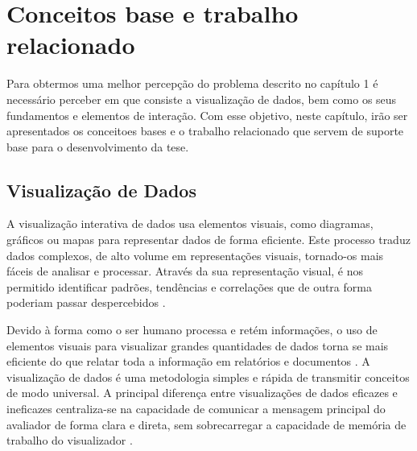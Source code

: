 
%

\chapter{Conceitos base e trabalho relacionado}
\label{cha:conceitos_base}

Para obtermos uma melhor percepção do problema descrito no capítulo 1 é necessário perceber em que consiste a visualização de dados, bem como os seus fundamentos e elementos de interação.
Com esse objetivo, neste capítulo, irão ser apresentados os conceitoes bases e o trabalho relacionado que servem de suporte base para o desenvolvimento da tese.

\section{Visualização de Dados}
\label{sec:vis_dados}


A visualização interativa de dados usa elementos visuais, como diagramas, gráficos ou mapas para representar dados de forma eficiente. Este processo traduz dados complexos, de alto volume em representações visuais, tornado-os mais fáceis de analisar e processar. Através da sua representação visual, é nos permitido identificar padrões, tendências e correlações que de outra forma poderiam passar despercebidos \cite{keim2002information}.

Devido à forma como o ser humano processa e retém informações, o uso de elementos visuais para visualizar grandes quantidades de dados torna se mais eficiente do que relatar toda a informação em relatórios e documentos \cite{ware2019information}. A visualização de dados é uma metodologia simples e rápida de transmitir conceitos de modo universal.
A principal diferença entre visualizações de dados eficazes e ineficazes centraliza-se na capacidade de comunicar a mensagem principal do avaliador de forma clara e direta, sem sobrecarregar a capacidade de memória de trabalho do visualizador \cite{evergreen2013design}.

